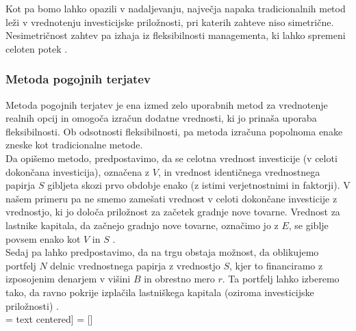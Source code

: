 Kot pa bomo lahko opazili v nadaljevanju, največja napaka tradicionalnih metod leži v vrednotenju investicijske priložnosti, pri katerih zahteve niso simetrične. Nesimetričnost zahtev pa izhaja iz fleksibilnosti managementa, ki lahko spremeni celoten potek \cite[str. 155]{Trigeorgis}. \\

\subsubsection{Metoda pogojnih terjatev}
Metoda pogojnih terjatev je ena izmed zelo uporabnih metod za vrednotenje realnih opcij in omogoča izračun dodatne vrednosti, ki jo prinaša uporaba fleksibilnosti. Ob odsotnosti fleksibilnosti, pa metoda izračuna popolnoma enake zneske kot tradicionalne metode.  \\
Da opišemo metodo, predpostavimo, da se celotna vrednost investicije (v celoti dokončana investicija), označena z $V$, in vrednost identičnega vrednostnega papirja $S$ gibljeta skozi prvo obdobje enako (z istimi verjetnostnimi in faktorji). V našem primeru pa ne smemo zamešati vrednost v celoti dokončane investicije z vrednostjo, ki jo določa priložnost za začetek gradnje nove tovarne. Vrednost za lastnike kapitala, da začnejo gradnjo nove tovarne, označimo jo z $E$, se giblje povsem enako kot $V$ in $S$  \cite[str. 155, 156]{Trigeorgis}.\\
Sedaj pa lahko predpostavimo, da na trgu obstaja možnost, da oblikujemo portfelj $N$ delnic vrednostnega papirja z vrednostjo $S$, kjer to financiramo z izposojenim denarjem v višini $B$ in obrestno mero $r$. Ta portfelj lahko izberemo tako, da ravno pokrije izplačila lastniškega kapitala (oziroma investicijske priložnosti) \cite[str. 156]{Trigeorgis}. \\


 =  text centered]
 = []
\\[0,5 cm]

